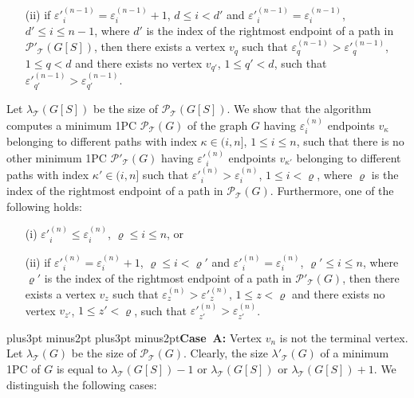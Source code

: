 \documentclass[10pt]{article}
\def\yskip{\penalty-50\vskip3pt plus3pt minus2pt}
\def\yy{\yskip\yskip}
\begin{document}
{\begin{itemize}
\item[(ii)] if $\varepsilon'^{(n-1)}_i = \varepsilon^{(n-1)}_i
+1$, $d \leq i < d'$ and $\varepsilon'^{(n-1)}_i =
\varepsilon^{(n-1)}_i$, $d' \leq i \leq n-1$, where $d'$ is the
index of the rightmost endpoint of a path in
$\mathcal{P'_{\mathcal{T}}}(G[S])$, then there exists a vertex
$v_q$ such that $\varepsilon^{(n-1)}_q > \varepsilon'^{(n-1)}_q$,
$1 \leq q < d$ and there exists no vertex $v_{q'}$, $1 \leq q'
<d$, such that
$\varepsilon'^{(n-1)}_{q'}>\varepsilon^{(n-1)}_{q'}$.

\end{itemize}

\noindent Let $\lambda_\mathcal{T}(G[S])$ be the size of
$\mathcal{P_{\mathcal{T}}}(G[S])$. We show that the algorithm
computes a minimum 1PC $\mathcal{P_{\mathcal{T}}}(G)$ of the graph
$G$ having $\varepsilon^{(n)}_i$ endpoints $v_\kappa$ belonging to
different paths with index $\kappa \in (i,n]$, $1 \leq i \leq n$,
such that there is no other minimum 1PC
$\mathcal{P'_{\mathcal{T}}}(G)$ having $\varepsilon'^{(n)}_i$
endpoints $v_{\kappa'}$ belonging to different paths with index
$\kappa' \in (i,n]$ such that
$\varepsilon'^{(n)}_i>\varepsilon^{(n)}_i$, $1 \leq i < \varrho$,
where $\varrho$ is the index of the rightmost endpoint of a path
in $\mathcal{P_{\mathcal{T}}}(G)$. Furthermore, one of the
following holds:
\begin{itemize}
\item[(i)] $\varepsilon'^{(n)}_i \leq \varepsilon^{(n)}_i$,
$\varrho \leq i \leq n$, or \item[(ii)] if $\varepsilon'^{(n)}_i =
\varepsilon^{(n)}_i +1$, $\varrho \leq i < \varrho'$ and
$\varepsilon'^{(n)}_i = \varepsilon^{(n)}_i$, $\varrho' \leq i
\leq n$, where $\varrho'$ is the index of the rightmost endpoint
of a path in $\mathcal{P'_{\mathcal{T}}}(G)$, then there exists a
vertex $v_z$ such that $\varepsilon^{(n)}_z >
\varepsilon'^{(n)}_z$, $1 \leq z < \varrho$ and there exists no
vertex $v_{z'}$, $1 \leq z' <\varrho$, such that
$\varepsilon'^{(n)}_{z'}>\varepsilon^{(n)}_{z'}$.

\end{itemize}

\yy {\bf Case~A:} Vertex $v_n$ is not the terminal vertex. Let
$\lambda_\mathcal{T}(G)$ be the size of
$\mathcal{P_{\mathcal{T}}}(G)$. Clearly, the size
$\lambda'_\mathcal{T}(G)$ of a minimum 1PC of $G$ is equal to
$\lambda_\mathcal{T}(G[S])-1$ or $\lambda_\mathcal{T}(G[S])$ or
$\lambda_\mathcal{T}(G[S])+1$. We distinguish the following cases:

}
\end{document}
